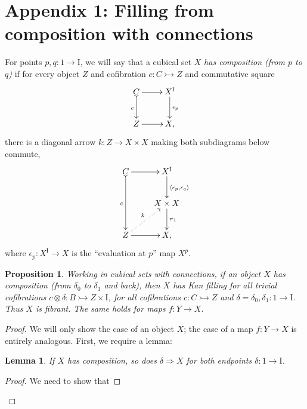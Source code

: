 \documentclass[11pt]{article}
\newcommand{\mono}{\ensuremath{\rightarrowtail}}
\newcommand{\ra}{\ensuremath{\rightarrow}}
\newcommand{\I}{\ensuremath{\mathrm{I}}}
\newtheorem{proposition}[theorem]{Proposition}
\newtheorem{lemma}[theorem]{Lemma}
\theoremstyle{remark}
\theoremstyle{definition}
\begin{document}
\section*{Appendix 1: Filling from composition with connections}\label{appendix:comptofillconnection}

For points $p, q: 1 \ra \I$, we will say that a cubical set $X$ \emph{has composition (from $p$ to $q$)} if for every object $Z$ and cofibration $c:C\mono Z$ and commutative square 
\begin{equation}\label{apdiagram:composition1}
\xymatrix{
C \ar@{>->}[d]_{c} \ar[r]  & X^\I \ar[d]^{\epsilon_p} \\
Z \ar[r] & X,
}
\end{equation}
there is a diagonal arrow $k : Z \to X\times X$ making both subdiagrams below commute,
\begin{equation}\label{apdiagram:composition2}
\xymatrix{
C \ar@{>->}[dd]_{c} \ar[r]  & X^\I \ar[d]^{\langle \epsilon_p, \epsilon_q\rangle} \\
& X\times X \ar[d]^{\pi_1} \\
Z \ar[r] \ar@{..>}[ru]^{k} & X,
}
\end{equation}
where $\epsilon_p : X^\I\to X$ is the ``evaluation at $p$'' map $X^p$.  

\begin{proposition}
Working in cubical sets with connections, if an object $X$ has composition (from $\delta_0$ to $\delta_1$ and back), then $X$ has Kan filling for all trivial cofibrations $c\otimes \delta : B \mono Z\times \I$, for all cofibrations $c : C\mono Z$ and $\delta = \delta_0 , \delta_1 : 1\to \I$. Thus $X$ is fibrant.  The same holds for maps $f: Y\to X$.
\end{proposition}
\begin{proof}
We will only show the case of an object $X$; the case of a map $f: Y\to X$ is entirely analogous. 
First, we require a lemma:

\begin{lemma}
If $X$ has composition, so does $\delta\Rightarrow X$ for both endpoints $\delta : 1 \to \I$.
\end{lemma}
\begin{proof}
We need to show that 
\end{proof}



\end{proof}
\end{document}
